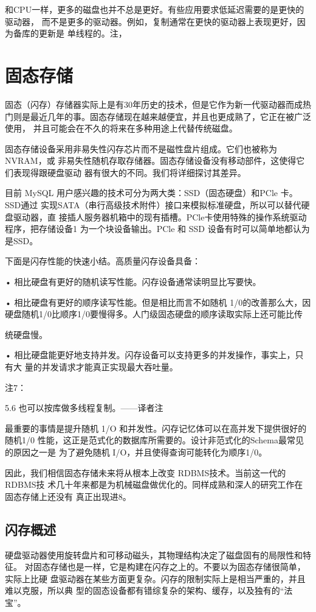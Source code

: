 和CPU一样，更多的磁盘也并不总是更好。有些应用要求低延迟需要的是更快的驱动器，
而不是更多的驱动器。例如，复制通常在更快的驱动器上表现更好，因为备库的更新是
单线程的。注，

\section{固态存储}
固态（闪存）存储器实际上是有30年历史的技术，但是它作为新一代驱动器而成热
门则是最近几年的事。固态存储现在越来越便宜，并且也更成熟了，它正在被广泛使用，
并且可能会在不久的将来在多种用途上代替传统磁盘。

固态存储设备采用非易失性闪存芯片而不是磁性盘片组成。它们也被称为 NVRAM，或
非易失性随机存取存储器。固态存储设备没有移动部件，这使得它们表现得跟硬盘驱动
器有很大的不同。我们将详细探讨其差异。

目前 MySQL 用户感兴趣的技术可分为两大类：SSD（固态硬盘）和PCle 卡。SSD通过
实现SATA（串行高级技术附件）接口来模拟标准硬盘，所以可以替代硬盘驱动器，直
接插人服务器机箱中的现有插槽。PCle卡使用特殊的操作系统驱动程序，把存储设备1
为一个块设备输出。PCle 和 SSD 设备有时可以简单地都认为是SSD。

下面是闪存性能的快速小结。高质量闪存设备具备：

• 相比硬盘有更好的随机读写性能。闪存设备通常读明显比写要快。

• 相比硬盘有更好的顺序读写性能。但是相比而言不如随机 1/0的改善那么大，因
硬盘随机1/0比顺序1/0要慢得多。人门级固态硬盘的顺序读取实际上还可能比传

统硬盘慢。

• 相比硬盘能更好地支持并发。闪存设备可以支持更多的并发操作，事实上，只有大
量的并发请求才能真正实现最大吞吐量。

注7：

5.6 也可以按库做多线程复制。——译者注

最重要的事情是提升随机 1/O 和并发性。闪存记忆体可以在高并发下提供很好的随机1/0
性能，这正是范式化的数据库所需要的。设计非范式化的Schema最常见的原因之一是
为了避免随机 I/O，并且使得查询可能转化为顺序1/0。

因此，我们相信固态存储未来将从根本上改变 RDBMS技术。当前这一代的RDBMS技
术几十年来都是为机械磁盘做优化的。同样成熟和深人的研究工作在固态存储上还没有
真正出现进8。

\subsection{闪存概述}
硬盘驱动器使用旋转盘片和可移动磁头，其物理结构决定了磁盘固有的局限性和特征。
对固态存储也是一样，它是构建在闪存之上的。不要以为固态存储很简单，实际上比硬
盘驱动器在某些方面更复杂。闪存的限制实际上是相当严重的，并且难以克服，所以典
型的固态设备都有错综复杂的架构、缓存，以及独有的“法宝”。

